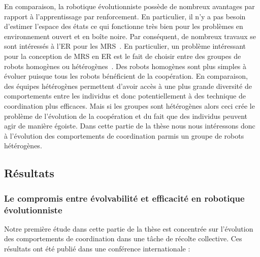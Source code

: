 		En comparaison, la robotique évolutionniste possède de nombreux avantages par rapport à l'apprentissage par renforcement. En particulier, il n'y a pas besoin d'estimer l'espace des états ce qui fonctionne très bien pour les problèmes en environnement ouvert et en boîte noire. Par conséquent, de nombreux travaux se sont intéressés à l'ER pour les MRS~\parencite{Watson2002, Brambilla2012, Hauert2014, Francesca2016}. En particulier, un problème intéressant pour la conception de MRS en ER est le fait de choisir entre des groupes de robots homogènes ou hétérogènes~\parencite{Waibel2009}. Des robots homogènes sont plus simples à évoluer puisque tous les robots bénéficient de la coopération. En comparaison, des équipes hétérogènes permettent d'avoir accès à une plus grande diversité de comportements entre les individus et donc potentiellement à des technique de coordination plus efficaces. Mais si les groupes sont hétérogènes alors ceci crée le problème de l'évolution de la coopération et du fait que des individus peuvent agir de manière égoiste. Dans cette partie de la thèse nous nous intéressons donc à l'évolution des comportements de coordination parmis un groupe de robots hétérogènes.

	\subsection{Résultats}

		\subsubsection{Le compromis entre évolvabilité et efficacité en robotique évolutionniste}

			Notre première étude dans cette partie de la thèse est concentrée sur l'évolution des comportements de coordination dans une tâche de récolte collective. Ces résultats ont été publié dans une conférence internationale :

			\begin{quote}
			\end{quote}

